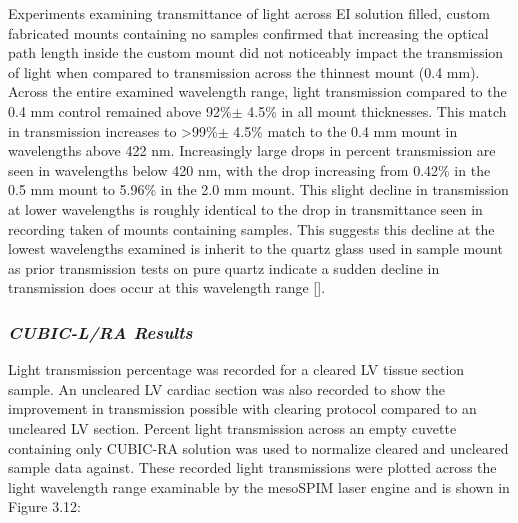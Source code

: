 Experiments examining transmittance of light across EI solution filled, custom fabricated mounts containing no samples confirmed that increasing the optical path length inside the custom mount did not noticeably impact the transmission of light when compared to transmission across the thinnest mount (0.4 mm). Across the entire examined wavelength range, light transmission compared to the 0.4 mm control remained above 92\%$\pm$ 4.5\% in all mount thicknesses. This match in transmission increases to >99\%$\pm$ 4.5\% match to the 0.4 mm mount in wavelengths above 422 nm. Increasingly large drops in percent transmission are seen in wavelengths below 420 nm, with the drop increasing from 0.42\% in the 0.5 mm mount to 5.96\% in the 2.0 mm mount. This slight decline in transmission at lower wavelengths is roughly identical to the drop in transmittance seen in recording taken of mounts containing samples. This suggests this decline at the lowest wavelengths examined is inherit to the quartz glass used in sample mount as prior transmission tests on pure quartz indicate a sudden decline in transmission does occur at this wavelength range [].


\subsubsection{\textit{CUBIC-L/RA Results}}

Light transmission percentage was recorded for a cleared LV tissue section sample. An uncleared LV cardiac section was also recorded to show the improvement in transmission possible with clearing protocol compared to an uncleared LV section.  Percent light transmission across an empty cuvette containing only CUBIC-RA solution was used to normalize cleared and uncleared sample data against. These recorded light transmissions were plotted across the light wavelength range examinable by the mesoSPIM laser engine and is shown in Figure 3.12: 

